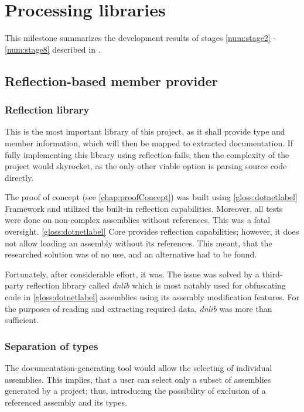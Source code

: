 \chapter{Processing libraries} \label{chap:processingLibraries}

This milestone summarizes the development results of stages \ref{num:stage2} - \ref{num:stage8} described in .

\section{Reflection-based member provider}

\subsection{Reflection library}

This is the most important library of this project, as it shall provide type and member information, which will then be mapped to extracted documentation. If fully implementing this library using reflection fails, then the complexity of the project would skyrocket, as the only other viable option is parsing source code directly.

The proof of concept (see \ref{chap:proofConcept}) was built using \ref{gloss:dotnetlabel} Framework and utilized the built-in reflection capabilities. Moreover, all tests were done on non-complex assemblies without references. This was a fatal oversight. \ref{gloss:dotnetlabel} Core provides reflection capabilities; however, it does not allow loading an assembly without its references. This meant, that the researched solution was of no use, and an alternative had to be found.

Fortunately, after considerable effort, it was. The issue was solved by a third-party reflection library called \textit{dnlib} which is most notably used for obfuscating code in \ref{gloss:dotnetlabel} assemblies using its assembly modification features. For the purposes of reading and extracting required data, \textit{dnlib} was more than sufficient.

\subsection{Separation of types}

The documentation-generating tool would allow the selecting of individual assemblies. This implies, that a user can select only a subset of assemblies generated by a project; thus, introducing the possibility of exclusion of a referenced assembly and its types.

